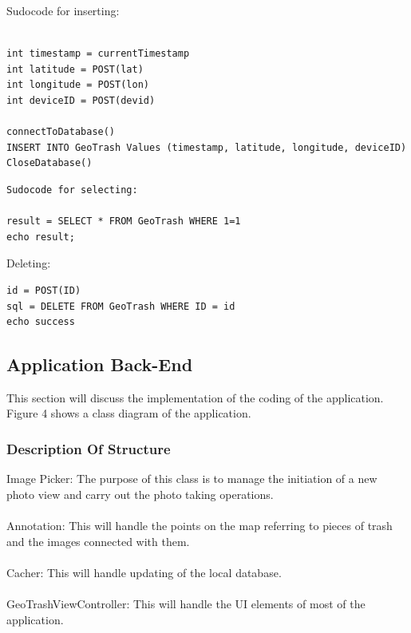 \documentclass[12pt]{article}
\begin{document}
Sudocode for inserting:
\begin{verbatim}

int timestamp = currentTimestamp
int latitude = POST(lat)
int longitude = POST(lon)
int deviceID = POST(devid)

connectToDatabase()
INSERT INTO GeoTrash Values (timestamp, latitude, longitude, deviceID)
CloseDatabase()
\end{verbatim}
\begin{verbatim}
Sudocode for selecting:

result = SELECT * FROM GeoTrash WHERE 1=1
echo result;
\end{verbatim}
Deleting:

\begin{verbatim}
id = POST(ID)
sql = DELETE FROM GeoTrash WHERE ID = id
echo success
\end{verbatim}

\subsection{Application Back-End}

This section will discuss the implementation of the coding of the application. Figure 4 shows a class diagram of the application.

\subsubsection{Description Of Structure}

Image Picker:
The purpose of this class is to manage the initiation of a new photo view and carry out the photo taking operations. 

\paragraph{}
Annotation:
This will handle the points on the map referring to pieces of trash and the images connected with them.

\paragraph{}
Cacher:
This will handle updating of the local database.

\paragraph{}
GeoTrashViewController:
This will handle the UI elements of most of the application.
\end{document}
